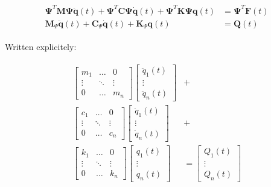 \documentclass[10pt,b5paper,titlepage]{book}
\newenvironment{ematrix}
{
    \begin{eqnarray}
        \begin{aligned}
}
{
        \end{aligned}
    \end{eqnarray}
}
\begin{document}
\begin{ematrix}
    \mathbf{\Psi}^T \mathbf{M} \mathbf{\Psi} \ddot{\mathbf{q}}(t) +
    \mathbf{\Psi}^T \mathbf{C} \mathbf{\Psi} \dot{\mathbf{q}}(t) +
    \mathbf{\Psi}^T \mathbf{K} \mathbf{\Psi} \mathbf{q}(t) &=
    \mathbf{\Psi}^T \mathbf{F}(t) \\
    \mathbf{M}_{\Psi} \ddot{\mathbf{q}}(t) +
    \mathbf{C}_{\Psi} \dot{\mathbf{q}}(t) +
    \mathbf{K}_{\Psi} \mathbf{q}(t) &= \mathbf{Q}(t)
\end{ematrix}

Written explicitely:

\begin{ematrix}
    \begin{bmatrix}
        m_1 & \dots & 0 \\
        \vdots & \ddots & \vdots \\
        0 & \dots & m_n
    \end{bmatrix}
    \begin{bmatrix}
        \ddot{q}_1(t) \\
        \vdots \\
        \ddot{q}_n(t)
    \end{bmatrix} &+ \\
    \begin{bmatrix}
        c_1 & \dots & 0 \\
        \vdots & \ddots & \vdots \\
        0 & \dots & c_n
    \end{bmatrix}
    \begin{bmatrix}
        \dot{q}_1(t) \\
        \vdots \\
        \dot{q}_n(t)
    \end{bmatrix} &+ \\
    \begin{bmatrix}
        k_1 & \dots & 0 \\
        \vdots & \ddots & \vdots \\
        0 & \dots & k_n
    \end{bmatrix}
    \begin{bmatrix}
        q_1(t) \\
        \vdots \\
        q_n(t)
    \end{bmatrix} &=
    \begin{bmatrix}
        Q_1(t) \\
        \vdots \\
        Q_n(t)
    \end{bmatrix}
\end{ematrix}
\end{document}
